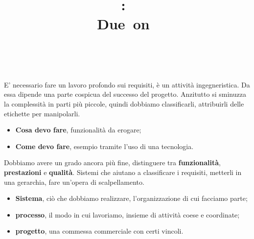 \documentclass{article}
\title{
\vspace{2in}
\textmd{\textbf{\hmwkClass:\ \hmwkTitle}}\\
\normalsize\vspace{0.1in}\small{Due\ on\ \hmwkDueDate}\\
\vspace{0.1in}\large{\textit{\hmwkClassInstructor\ \hmwkClassTime}}
\vspace{3in}
}
\author{\textbf{\hmwkAuthorName}}
\date{} %
\begin{document}
\maketitle



\newpage
\tableofcontents
\newpage



E' necessario fare un lavoro profondo sui requisiti, è un attività ingegneristica. Da essa dipende una parte cospicua del successo del progetto. Anzitutto si sminuzza la complessità in parti più piccole, quindi dobbiamo classificarli, attribuirli delle etichette per manipolarli.

\begin{itemize}

	\item \textbf{Cosa devo fare}, funzionalità da erogare;
	\item \textbf{Come devo fare}, esempio tramite l'uso di una tecnologia.

\end{itemize}

Dobbiamo avere un grado ancora più fine, distinguere tra \textbf{funzionalità}, \textbf{prestazioni} e \textbf{qualità}. Sistemi che aiutano a classificare i requisiti, metterli in una gerarchia, fare un'opera di scalpellamento.

\begin{itemize}

	\item \textbf{Sistema}, ciò che dobbiamo realizzare, l'organizzazione di cui facciamo parte;
	\item \textbf{processo}, il modo in cui lavoriamo, insieme di attività coese e coordinate;
	\item \textbf{progetto}, una commessa commerciale con certi vincoli.

\end{itemize}
\end{document}
